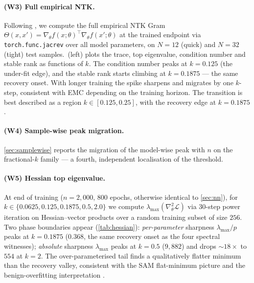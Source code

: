 \paragraph{(W3) Full empirical NTK.} Following \citet{jacot2018neural}, we compute the full empirical NTK Gram $\Theta(x,x') = \nabla_\theta f(x;\theta)^\top \nabla_\theta f(x';\theta)$ at the trained endpoint via \texttt{torch.func.jacrev} over all model parameters, on $N=12$ (quick) and $N=32$ (tight) test samples. \,(left) plots the trace, top eigenvalue, condition number and stable rank as functions of $k$. The condition number peaks at $k\!=\!0.125$ (the under-fit edge), and the stable rank starts climbing at $k\!=\!0.1875$ --- the same recovery onset. With longer training the spike sharpens and migrates by one $k$-step, consistent with EMC depending on the training horizon. The transition is best described as a region $k\!\in\![0.125, 0.25]$, with the recovery edge at $k\!=\!0.1875$.

\paragraph{(W4) Sample-wise peak migration.} \cref{sec:samplewise} reports the migration of the model-wise peak with $n$ on the fractional-$k$ family --- a fourth, independent localisation of the threshold.

\paragraph{(W5) Hessian top eigenvalue.} At end of training ($n\!=\!2{,}000$, 800 epochs, otherwise identical to \cref{sec:nn}), for $k\!\in\!\{0.0625, 0.125, 0.1875, 0.5, 2.0\}$ we compute $\lambda_{\max}(\nabla^2_\theta \mathcal{L})$ via 30-step power iteration on Hessian--vector products over a random training subset of size $256$. Two phase boundaries appear (\cref{tab:hessian}): \emph{per-parameter} sharpness $\lambda_{\max}/p$ peaks at $k\!=\!0.1875$ ($0.368$, the same recovery onset as the four spectral witnesses); \emph{absolute} sharpness $\lambda_{\max}$ peaks at $k\!=\!0.5$ ($9{,}882$) and drops $\sim 18\times$ to $554$ at $k\!=\!2$. The over-parameterised tail finds a qualitatively flatter minimum than the recovery valley, consistent with the SAM \citep{foret2021sharpness} flat-minimum picture and the benign-overfitting interpretation \citep{bartlett2020benign}.

